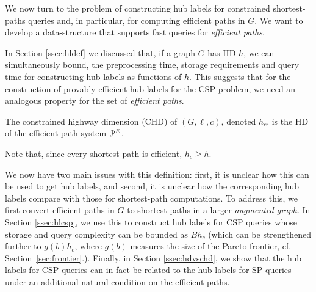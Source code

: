 We now turn to the problem of constructing hub labels for constrained shortest-paths queries and, in particular, for computing efficient paths in $G$. 
We want to develop a data-structure that supports fast queries for \emph{efficient paths}. 

In Section \ref{ssec:hldef} we discussed that, if a graph $G$ has HD $h$, we can simultaneously bound, the preprocessing time, storage requirements and query time for constructing hub labels as functions of $h$.
This suggests that for the construction of provably efficient hub labels for the CSP problem, we need an analogous property for the set of \emph{efficient paths}.
\begin{definition} The constrained highway dimension (CHD) of $(G,\ell,c)$, denoted $h_c$, is the HD of the efficient-path system $\mathcal{P}^E$.
\end{definition}
Note that, since every shortest path is efficient, $h_c\geq h$.

We now have two main issues with this definition: first, it is unclear how this can be used to get hub labels, and second, it is unclear how the corresponding hub labels compare with those for shortest-path computations. 
To address this, we first convert efficient paths in $G$ to shortest paths in a larger \emph{augmented graph}. 
In Section \ref{ssec:hlcsp}, we use this to construct hub labels for CSP queries whose storage and query complexity can be bounded as  $Bh_c$ (which can be strengthened further to $g(b)h_c$, where $g(b)$ measures the size of the Pareto frontier, cf. Section~\ref{sec:frontier}.). 
Finally, in Section \ref{ssec:hdvschd}, we show that the hub labels for CSP queries can in fact be related to the hub labels for SP queries under an additional natural condition on the efficient paths.